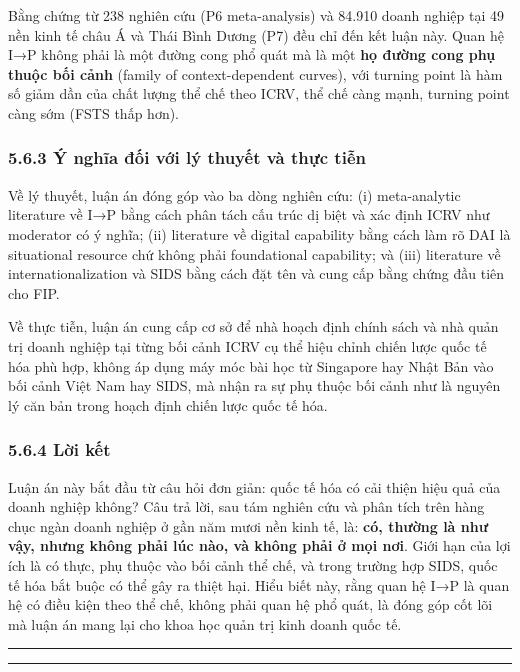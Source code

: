 \documentclass[12pt,a4paper]{article}
\begin{document}
Bằng chứng từ 238 nghiên cứu (P6 meta-analysis) và 84.910 doanh nghiệp
tại 49 nền kinh tế châu Á và Thái Bình Dương (P7) đều chỉ đến kết luận
này. Quan hệ I→P không phải là một đường cong phổ quát mà là một
\textbf{họ đường cong phụ thuộc bối cảnh} (family of context-dependent
curves), với turning point là hàm số giảm dần của chất lượng thể chế
theo ICRV, thể chế càng mạnh, turning point càng sớm (FSTS thấp hơn).

\hypertarget{563-uxfd-nghux129a-ux111ux1ed1i-vux1edbi-luxfd-thuyux1ebft-vuxe0-thux1ef1c-tiux1ec5n}{%
\subsubsection{5.6.3 Ý nghĩa đối với lý thuyết và thực
tiễn}\label{563-uxfd-nghux129a-ux111ux1ed1i-vux1edbi-luxfd-thuyux1ebft-vuxe0-thux1ef1c-tiux1ec5n}}

Về lý thuyết, luận án đóng góp vào ba dòng nghiên cứu: (i) meta-analytic
literature về I→P bằng cách phân tách cấu trúc dị biệt và xác định ICRV
như moderator có ý nghĩa; (ii) literature về digital capability bằng
cách làm rõ DAI là situational resource chứ không phải foundational
capability; và (iii) literature về internationalization và SIDS bằng
cách đặt tên và cung cấp bằng chứng đầu tiên cho FIP.

Về thực tiễn, luận án cung cấp cơ sở để nhà hoạch định chính sách và nhà
quản trị doanh nghiệp tại từng bối cảnh ICRV cụ thể hiệu chỉnh chiến
lược quốc tế hóa phù hợp, không áp dụng máy móc bài học từ Singapore hay
Nhật Bản vào bối cảnh Việt Nam hay SIDS, mà nhận ra sự phụ thuộc bối
cảnh như là nguyên lý căn bản trong hoạch định chiến lược quốc tế hóa.

\hypertarget{564-lux1eddi-kux1ebft}{%
\subsubsection{5.6.4 Lời kết}\label{564-lux1eddi-kux1ebft}}

Luận án này bắt đầu từ câu hỏi đơn giản: quốc tế hóa có cải thiện hiệu
quả của doanh nghiệp không? Câu trả lời, sau tám nghiên cứu và phân tích
trên hàng chục ngàn doanh nghiệp ở gần năm mươi nền kinh tế, là:
\textbf{có, thường là như vậy, nhưng không phải lúc nào, và không phải ở
mọi nơi}. Giới hạn của lợi ích là có thực, phụ thuộc vào bối cảnh thể
chế, và trong trường hợp SIDS, quốc tế hóa bắt buộc có thể gây ra thiệt
hại. Hiểu biết này, rằng quan hệ I→P là quan hệ có điều kiện theo thể
chế, không phải quan hệ phổ quát, là đóng góp cốt lõi mà luận án mang
lại cho khoa học quản trị kinh doanh quốc tế.

\begin{center}\rule{0.5\linewidth}{0.5pt}\end{center}

\begin{center}\rule{0.5\linewidth}{0.5pt}\end{center}
\end{document}
